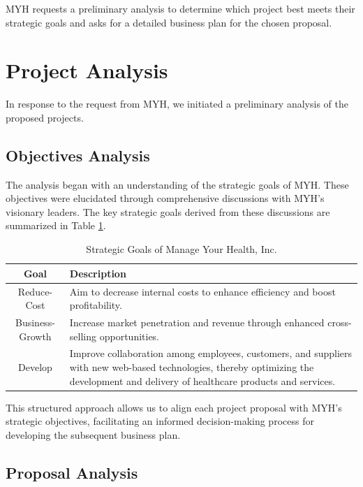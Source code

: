 MYH requests a preliminary analysis to determine which project best meets their strategic goals and asks for a detailed business plan for the chosen proposal.

\section{Project Analysis}

In response to the request from MYH, we initiated a preliminary analysis of the proposed projects. 

\subsection{Objectives Analysis}

The analysis began with an understanding of the strategic goals of MYH. These objectives were elucidated through comprehensive discussions with MYH's visionary leaders. The key strategic goals derived from these discussions are summarized in Table \ref{tab:myh_goals}.

\begin{table}[h]
    \centering
    \begin{tabular}{|c|p{10cm}|}
    \hline
    \textbf{Goal} & \textbf{Description} \\
    \hline
    Reduce-Cost & Aim to decrease internal costs to enhance efficiency and boost profitability. \\
    \hline
    Business-Growth & Increase market penetration and revenue through enhanced cross-selling opportunities. \\
    \hline
    Develop & Improve collaboration among employees, customers, and suppliers with new web-based technologies, thereby optimizing the development and delivery of healthcare products and services. \\
    \hline
    \end{tabular}
    \caption{Strategic Goals of Manage Your Health, Inc.}
    \label{tab:myh_goals}
\end{table}

\FloatBarrier

This structured approach allows us to align each project proposal with MYH's strategic objectives, facilitating an informed decision-making process for developing the subsequent business plan.

\subsection{Proposal Analysis}

